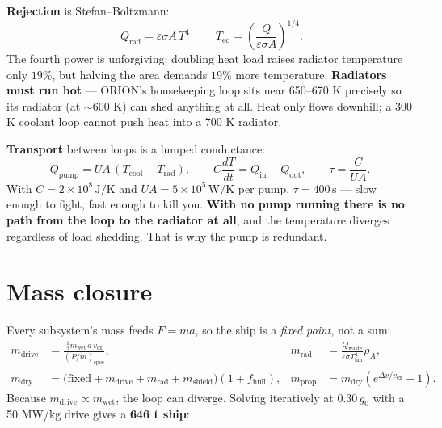 \documentclass[11pt]{article}
\newcommand{\ve}{v_{\text{ex}}}
\newcommand{\gz}{g_0}
\newcommand{\unit}[1]{\,\mathrm{#1}}
\begin{document}
\textbf{Rejection} is Stefan--Boltzmann:
\begin{equation}
\boxed{\;Q_{\text{rad}}=\varepsilon\sigma A\,T^{4}\;}\qquad
T_{\text{eq}}=\left(\frac{Q}{\varepsilon\sigma A}\right)^{1/4}.
\end{equation}
The fourth power is unforgiving: doubling heat load raises radiator temperature only $19\%$, but halving the area demands $19\%$ more temperature. \textbf{Radiators must run hot} --- ORION's housekeeping loop sits near 650--670 K precisely so its radiator (at $\sim$600 K) can shed anything at all. Heat only flows downhill; a 300 K coolant loop cannot push heat into a 700 K radiator.

\textbf{Transport} between loops is a lumped conductance:
\begin{equation}
Q_{\text{pump}}=UA\,(T_{\text{cool}}-T_{\text{rad}}),\qquad
C\frac{dT}{dt}=Q_{\text{in}}-Q_{\text{out}},\qquad \tau=\frac{C}{UA}.
\end{equation}
With $C=2\times10^{8}\unit{J/K}$ and $UA=5\times10^{5}\unit{W/K}$ per pump, $\tau=400\unit{s}$ --- slow enough to fight, fast enough to kill you. \textbf{With no pump running there is no path from the loop to the radiator at all}, and the temperature diverges regardless of load shedding. That is why the pump is redundant.

\begin{center}
\end{center}

\section{Mass closure}
Every subsystem's mass feeds $F=ma$, so the ship is a \emph{fixed point}, not a sum:
\begin{align}
m_{\text{drive}}&=\frac{\tfrac12 m_{\text{wet}}\,a\,\ve}{(P/m)_{\text{spec}}}, &
m_{\text{rad}}&=\frac{Q_{\text{waste}}}{\varepsilon\sigma T_{\lim}^{4}}\rho_A,\\
m_{\text{dry}}&=\big(\text{fixed}+m_{\text{drive}}+m_{\text{rad}}+m_{\text{shield}}\big)(1+f_{\text{hull}}), &
m_{\text{prop}}&=m_{\text{dry}}\!\left(e^{\Delta v/\ve}-1\right).
\end{align}
Because $m_{\text{drive}}\propto m_{\text{wet}}$, the loop can diverge. Solving iteratively at $0.30\,\gz$ with a 50 MW/kg drive gives a \textbf{646 t ship}:
\end{document}
